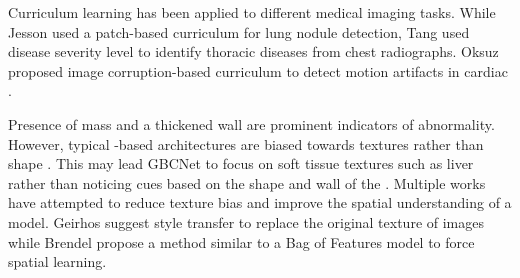 
%
Curriculum learning has been applied to different medical imaging tasks. While Jesson \etal \cite{jesson2017cased} used a patch-based curriculum for lung nodule detection, Tang \etal \cite{tang2018attention} used disease severity level to identify thoracic diseases from chest radiographs. Oksuz \etal \cite{oksuz2019automatic} proposed image corruption-based curriculum to detect motion artifacts in cardiac \mri. 

%
Presence of mass and a thickened \gb wall are prominent indicators of \gb abnormality. However, typical \cnn-based architectures are biased towards textures rather than shape \cite{geirhos2018Texture}. This may lead GBCNet to focus on soft tissue textures such as liver rather than noticing cues based on the shape and wall of the \gb. 
Multiple works have attempted to reduce texture bias and improve the spatial understanding of a model. Geirhos \etal \cite{geirhos2018Texture} suggest style transfer to replace the original texture of images while Brendel \etal \cite{brendel2019BagOfFeatures} propose a method similar to a Bag of Features model to force spatial learning. 

